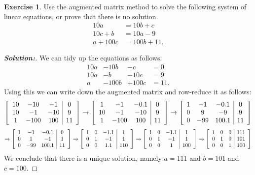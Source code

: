 \documentclass[a4paper]{amsart}
\theoremstyle{definition}
\newtheorem{exercise}{Exercise}
\newenvironment{solution}{\begin{proof}[\textbf{Solution:}] \vphantom{u}}{\end{proof}}
\begin{document}
\begin{exercise}\label{ex-solve-i}
 Use the augmented matrix method to solve the following system of
 linear equations, or prove that there is no solution.
 \begin{align*}
  10a &= 10b+c \\
  10c+b &= 10a-9 \\
  a+100c &= 100b+11.
 \end{align*}
\end{exercise}
\begin{solution}
 We can tidy up the equations as follows:
 \[ \begin{array}{rrrl}
     10a & -10b & -c &= 0 \\
     10a & -b & -10c &= 9 \\
     a & -100b & +100c &= 11. 
    \end{array}
 \]
 Using this we can write down the augmented matrix and row-reduce it
 as follows:
 \[ 
  \left[\begin{array}{ccc|c}
   10 & -10 & -1 & 0 \\
   10 & -1 & -10 & 9 \\
   1 & -100 & 100 & 11 
  \end{array}\right]
  \xrightarrow{}
  \left[\begin{array}{ccc|c}
   1 & -1 & -0.1 & 0 \\
   10 & -1 & -10 & 9 \\
   1 & -100 & 100 & 11 
  \end{array}\right]
  \xrightarrow{}
  \left[\begin{array}{ccc|c}
   1 & -1 & -0.1 & 0 \\
   0 & 9 & -9 & 9 \\
   0 & -99 & 100.1 & 11 
  \end{array}\right]
 \] \[
  \xrightarrow{}
  \left[\begin{array}{ccc|c}
   1 & -1 & -0.1 & 0 \\
   0 & 1 & -1 & 1 \\
   0 & -99 & 100.1 & 11 
  \end{array}\right]
  \xrightarrow{}
  \left[\begin{array}{ccc|c}
   1 & 0 & -1.1 & 1 \\
   0 & 1 & -1 & 1 \\
   0 & 0 & 1.1 & 110 
  \end{array}\right]
  \xrightarrow{}
  \left[\begin{array}{ccc|c}
   1 & 0 & -1.1 & 1 \\
   0 & 1 & -1 & 1 \\
   0 & 0 & 1 & 100 
  \end{array}\right]
  \xrightarrow{}
  \left[\begin{array}{ccc|c}
   1 & 0 & 0 & 111 \\
   0 & 1 & 0 & 101 \\
   0 & 0 & 1 & 100 
  \end{array}\right]
 \]
 We conclude that there is a unique solution, namely $a=111$ and
 $b=101$ and $c=100$.
\end{solution}
\end{document}
